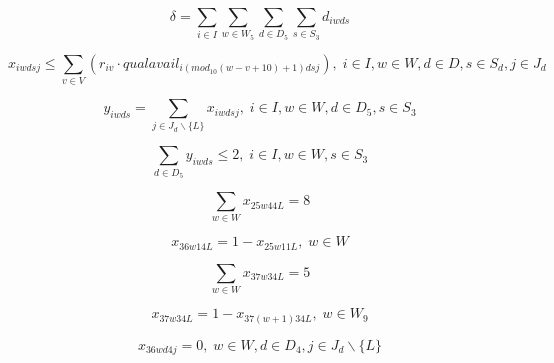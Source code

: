 \begin{equation} %
\delta = \sum_{i \in I} \sum_{w \in W_5} \sum_{d \in D_5} \sum_{s \in S_3} d_{iwds}
\end{equation}

\begin{equation}
x_{iwdsj} \leq \sum_{v \in V} (r_{iv} \cdot qualavail_{i(mod_{10}(w-v+10)+1)dsj}), \; i \in I, w \in W, d \in D, s \in S_d, j \in J_d
\end{equation}

\begin{equation}
y_{iwds} = \sum_{j \in J_d \backslash \{L\}} x_{iwdsj}, \; i \in I, w \in W, d \in D_5, s \in S_3
\end{equation}

\begin{equation}
\sum_{d \in D_5} y_{iwds} \leq 2, \; i \in I, w \in W, s \in S_3
\end{equation}

\begin{equation}
\sum_{w \in W} x_{25w44L} = 8
\end{equation}

\begin{equation}
x_{36w14L} = 1 - x_{25w11L}, \; w \in W
\end{equation}

\begin{equation}
\sum_{w \in W} x_{37w34L} = 5
\end{equation}

\begin{equation}
x_{37w34L} = 1 - x_{37(w+1)34L}, \; w \in W_9
\end{equation}

\begin{equation}
x_{36wd4j} = 0, \; w \in W, d \in D_4, j \in J_d \backslash \{L\}
\end{equation}